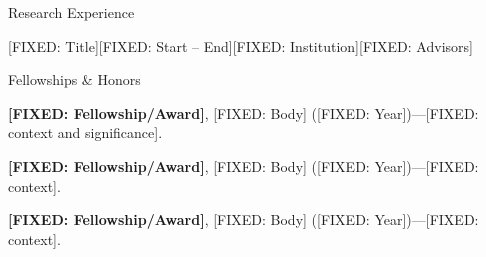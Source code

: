 \documentclass{cv}
\begin{document}
\begin{rSection}{Research Experience}
\begin{rSubsection}{[FIXED: Title]}{\textcolor{black!60}{[FIXED: Start -- End]}}{[FIXED: Institution]}{[FIXED: Advisors]}
\item [GENERATE: Bullet]
\item [GENERATE: Bullet]

\end{rSubsection}


\end{rSection}


\begin{rSection2}{Fellowships \& Honors}
\item \textbf{[FIXED: Fellowship/Award]}, [FIXED: Body] ([FIXED: Year])---[FIXED: context and significance].
\item \textbf{[FIXED: Fellowship/Award]}, [FIXED: Body] ([FIXED: Year])---[FIXED: context].
\item \textbf{[FIXED: Fellowship/Award]}, [FIXED: Body] ([FIXED: Year])---[FIXED: context].
\end{rSection2}

\end{document}
